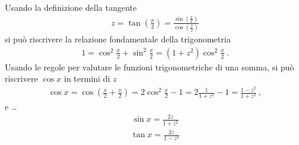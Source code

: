 \documentclass[letterpaper,10pt,italian]{jupyterBook}
\begin{document}
\begin{itemize}
\sphinxAtStartPar
Usando la definizione della tangente
\begin{equation*}
\begin{split}z = \tan \left(\frac{x}{2}\right) = \frac{\sin \left(\frac{x}{2}\right)}{\cos \left(\frac{x}{2}\right)}\end{split}
\end{equation*}
\sphinxAtStartPar
si può riscrivere la relazione fondamentale della trigonometria
\begin{equation*}
\begin{split}1 = \cos^2 \frac{x}{2} + \sin^2 \frac{x}{2} = (1 + z^2) \cos^2 \frac{x}{2}\ .\end{split}
\end{equation*}
\sphinxAtStartPar
Usando le regole per valutare le funzioni trigonometriche di una somma, si può riscrivere \(\cos x\) in termini di \(z\)
\begin{equation*}
\begin{split}\cos x = \cos \left( \frac{x}{2} + \frac{x}{2} \right) = 2 \cos^2 \frac{x}{2} - 1 = 2 \frac{1}{1+z^2} - 1 = \frac{1-z^2}{1+z^2} \ ,\end{split}
\end{equation*}
\sphinxAtStartPar
e  …
\begin{equation*}
\begin{split}\sin x = \frac{2 z}{1 + z^2}\end{split}
\end{equation*}\begin{equation*}
\begin{split}\tan x = \frac{2 z}{1 - z^2}\end{split}
\end{equation*}
\end{itemize}

\sphinxstepscope
\end{document}
